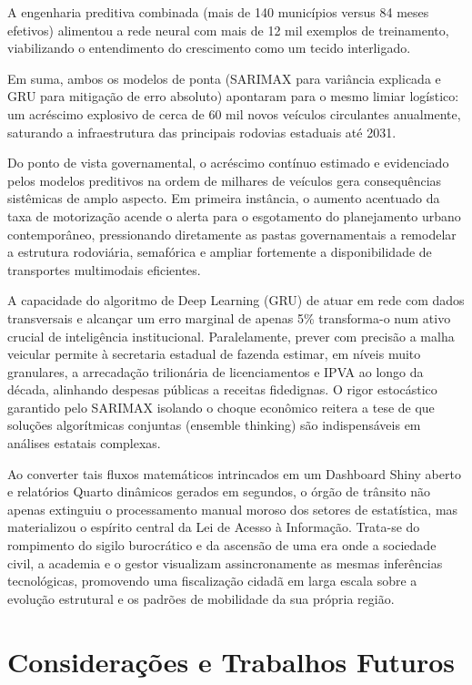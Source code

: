 \documentclass[10pt,conference]{IEEEtran}
\begin{document}
A engenharia preditiva combinada (mais de 140 municípios versus 84 meses efetivos) alimentou a rede neural com mais de 12 mil exemplos de treinamento, viabilizando o entendimento do crescimento como um tecido interligado. 

Em suma, ambos os modelos de ponta (SARIMAX para variância explicada e GRU para mitigação de erro absoluto) apontaram para o mesmo limiar logístico: um acréscimo explosivo de cerca de 60 mil novos veículos circulantes anualmente, saturando a infraestrutura das principais rodovias estaduais até 2031.

Do ponto de vista governamental, o acréscimo contínuo estimado e evidenciado pelos modelos preditivos na ordem de milhares de veículos gera consequências sistêmicas de amplo aspecto. Em primeira instância, o aumento acentuado da taxa de motorização acende o alerta para o esgotamento do planejamento urbano contemporâneo, pressionando diretamente as pastas governamentais a remodelar a estrutura rodoviária, semafórica e ampliar fortemente a disponibilidade de transportes multimodais eficientes.

A capacidade do algoritmo de Deep Learning (GRU) de atuar em rede com dados transversais e alcançar um erro marginal de apenas 5\% transforma-o num ativo crucial de inteligência institucional. Paralelamente, prever com precisão a malha veicular permite à secretaria estadual de fazenda estimar, em níveis muito granulares, a arrecadação trilionária de licenciamentos e IPVA ao longo da década, alinhando despesas públicas a receitas fidedignas. O rigor estocástico garantido pelo SARIMAX isolando o choque econômico reitera a tese de que soluções algorítmicas conjuntas (ensemble thinking) são indispensáveis em análises estatais complexas.

Ao converter tais fluxos matemáticos intrincados em um Dashboard Shiny aberto e relatórios Quarto dinâmicos gerados em segundos, o órgão de trânsito não apenas extinguiu o processamento manual moroso dos setores de estatística, mas materializou o espírito central da Lei de Acesso à Informação. Trata-se do rompimento do sigilo burocrático e da ascensão de uma era onde a sociedade civil, a academia e o gestor visualizam assincronamente as mesmas inferências tecnológicas, promovendo uma fiscalização cidadã em larga escala sobre a evolução estrutural e os padrões de mobilidade da sua própria região.


\section{Considerações e Trabalhos Futuros}
\label{sec:conclui}
\end{document}
